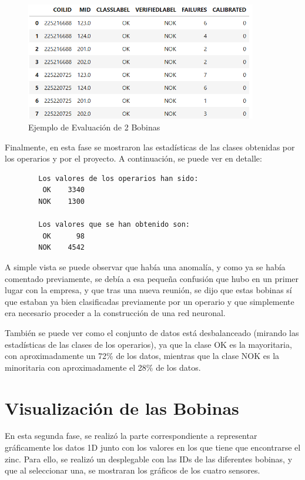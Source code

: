 \begin{figure}[h]
 \centering
  \includegraphics[width=0.9\textwidth]{img/evalua1.PNG}
 \caption{Ejemplo de Evaluación de 2 Bobinas}
 \label{f:evalua1}
\end{figure}

Finalmente, en esta fase se mostraron las estadísticas de las clases obtenidas por los operarios y por el proyecto. A continuación, se puede ver en detalle:
\begin{verbatim} 
        Los valores de los operarios han sido:
         OK    3340
        NOK    1300
        
        Los valores que se han obtenido son:
         OK      98
        NOK    4542
\end{verbatim}
A simple vista se puede observar que había una anomalía, y como ya se había comentado previamente, se debía a esa pequeña confusión que hubo en un primer lugar con la empresa, y que tras una nueva reunión, se dijo que estas bobinas sí que estaban ya bien clasificadas previamente por un operario y que simplemente era necesario proceder a la construcción de una red neuronal. 

También se puede ver como el conjunto de datos está desbalanceado (mirando las estadísticas de las clases de los operarios), ya que la clase OK es la mayoritaria, con aproximadamente un 72\% de los datos, mientras que la clase NOK es la minoritaria con aproximadamente el 28\% de los datos.

\section{Visualización de las Bobinas}
En esta segunda fase, se realizó la parte correspondiente a representar gráficamente los datos 1D junto con los valores en los que tiene que encontrarse el zinc. Para ello, se realizó un desplegable con las IDs de las diferentes bobinas, y que al seleccionar una, se mostraran los gráficos de los cuatro sensores. 


